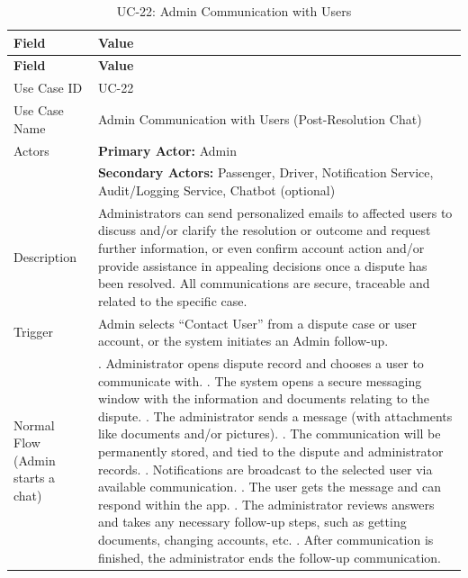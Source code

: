 \begin{longtable}{|>{\raggedright\arraybackslash}p{4cm}|>{\raggedright\arraybackslash}p{11cm}|}
\caption{UC-22: Admin Communication with Users}
\label{tab:uc-22} \\
\hline
\rowcolor{lightgray!30}
\textbf{Field} & \textbf{Value} \\
\hline
\endfirsthead
\hline
\rowcolor{lightgray!30}
\textbf{Field} & \textbf{Value} \\
\hline
\endhead
\hline
\endfoot
\hline
\endlastfoot
Use Case ID & UC-22 \\
\hline
Use Case Name & Admin Communication with Users (Post-Resolution Chat) \\
\hline
Actors & \textbf{Primary Actor:} Admin \\
& \textbf{Secondary Actors:} Passenger, Driver, Notification Service, Audit/Logging Service, Chatbot (optional) \\
\hline
Description & Administrators can send personalized emails to affected users to discuss and/or clarify the resolution or outcome and request further information, or even confirm account action and/or provide assistance in appealing decisions once a dispute has been resolved. All communications are secure, traceable and related to the specific case. \\
\hline
Trigger & Admin selects ``Contact User'' from a dispute case or user account, or the system initiates an Admin follow-up. \\
\hline
Normal Flow (Admin starts a chat) & 1. Administrator opens dispute record and chooses a user to communicate with. \newline 2. The system opens a secure messaging window with the information and documents relating to the dispute. \newline 3. The administrator sends a message (with attachments like documents and/or pictures). \newline 4. The communication will be permanently stored, and tied to the dispute and administrator records. \newline 5. Notifications are broadcast to the selected user via available communication. \newline 6. The user gets the message and can respond within the app. \newline 7. The administrator reviews answers and takes any necessary follow-up steps, such as getting documents, changing accounts, etc. \newline 8. After communication is finished, the administrator ends the follow-up communication. \\

\end{longtable}
